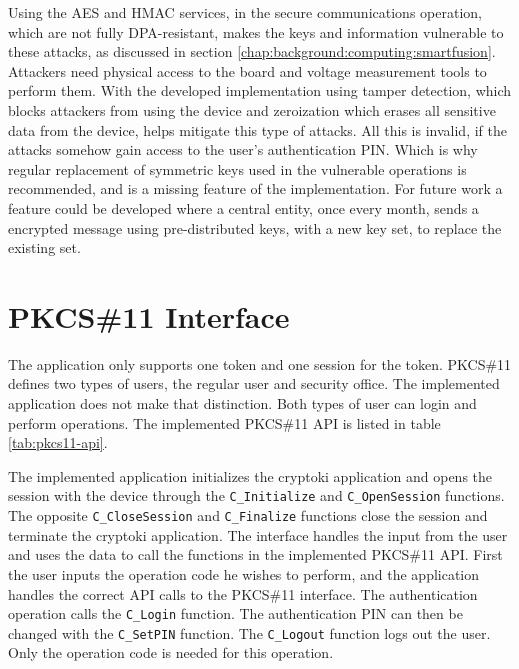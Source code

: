 Using the AES and HMAC services, in the secure communications operation, which are not fully DPA-resistant, makes the keys and information vulnerable to these attacks, as discussed in section \ref{chap:background:computing:smartfusion}.
Attackers need physical access to the board and voltage measurement tools to perform them.
With the developed implementation using tamper detection, which blocks attackers from using the device and zeroization which erases all sensitive data from the device, helps mitigate this type of attacks.
All this is invalid, if the attacks somehow gain access to the user's authentication PIN.
Which is why regular replacement of symmetric keys used in the vulnerable operations is recommended, and is a missing feature of the implementation.
For future work a feature could be developed where a central entity, once every month, sends a encrypted message using pre-distributed keys, with a new key set, to replace the existing set.


\section{PKCS\#11 Interface}\label{chap:implementation:app:interface}

The application only supports one token and one session for the token.
PKCS\#11 defines two types of users, the regular user and security office. The implemented application does not make that distinction. Both types of user can login and perform operations.
The implemented PKCS\#11 API is listed in table \ref{tab:pkcs11-api}.

The implemented application initializes the cryptoki application and opens the session with the device through the \texttt{C\_Initialize} and \texttt{C\_OpenSession} functions.
The opposite \texttt{C\_CloseSession} and \texttt{C\_Finalize} functions close the session and terminate the cryptoki application.
The interface handles the input from the user and uses the data to call the functions in the implemented PKCS\#11 API.
First the user inputs the operation code he wishes to perform, and the application handles the correct API calls to the PKCS\#11 interface.
The authentication operation calls the \texttt{C\_Login} function. The authentication PIN can then be changed with the \texttt{C\_SetPIN} function.
The \texttt{C\_Logout} function logs out the user. Only the operation code is needed for this operation.

